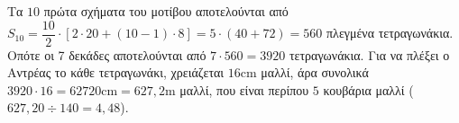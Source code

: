 \begin{alist}
\begin{rlist}
\item Τα $10$ πρώτα σχήματα του μοτίβου αποτελούνται από
$S_{10} = \dfrac{10}{2} \cdot [2 \cdot 20 + (10 - 1) \cdot 8] = 5 \cdot (40 + 72) = 560$ πλεγμένα τετραγωνάκια.
Οπότε οι 7 δεκάδες αποτελούνται από $7 \cdot 560 = 3920$ τετραγωνάκια. Για να πλέξει ο Αντρέας το κάθε τετραγωνάκι, χρειάζεται $16\text{cm}$ μαλλί, άρα συνολικά $3920 \cdot 16 = 62720\text{cm} = 627,2\text{m}$ μαλλί, που είναι περίπου $5$ κουβάρια μαλλί ($627,20 \div 140 = 4,48$).
\end{rlist}
\end{alist}

